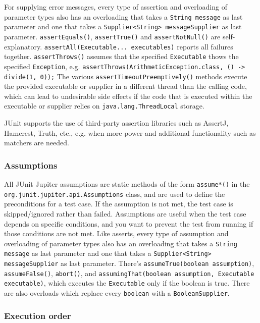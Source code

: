 \documentclass[8pt, table, xcdraw]{article}%
\begin{document}
For supplying error messages, every type of assertion and overloading of parameter types also has an overloading that takes a \lstinline{String message} as last parameter and one that takes a \lstinline{Supplier<String> messageSupplier} as last parameter. \lstinline{assertEquals()}, \lstinline{assertTrue()} and \lstinline{assertNotNull()} are self-explanatory. \lstinline{assertAll(Executable... executables)} reports all failures together. \lstinline{assertThrows()} assumes that the specified \lstinline{Executable} thows the specified \lstinline{Exception}, e.g. \lstinline{assertThrows(ArithmeticException.class, () -> divide(1, 0));} The various \lstinline{assertTimeoutPreemptively()} methods execute the provided executable or supplier in a different thread than the calling code, which can lead to undesirable side effects if the code that is executed within the executable or supplier relies on \lstinline{java.lang.ThreadLocal} storage.

JUnit supports the use of third-party assertion libraries such as AssertJ, Hamcrest, Truth, etc., e.g. when more power and additional functionality such as matchers are needed.

\subsubsection{Assumptions}

All JUnit Jupiter assumptions are static methods of the form \lstinline{assume*()} in the \lstinline{org.junit.jupiter.api.Assumptions} class, and are used to define the preconditions for a test case. If the assumption is not met, the test case is skipped/ignored rather than failed. Assumptions are useful when the test case depends on specific conditions, and you want to prevent the test from running if those conditions are not met. Like asserts, every type of assumption and overloading of parameter types also has an overloading that takes a \lstinline{String message} as last parameter and one that takes a \lstinline{Supplier<String> messageSupplier} as last parameter. There's \lstinline{assumeTrue(boolean assumption)}, \lstinline{assumeFalse()}, \lstinline{abort()}, and \lstinline{assumingThat(boolean assumption, Executable executable)}, which executes the \lstinline{Executable} only if the boolean is true. There are also overloads which replace every \lstinline{boolean} with a \lstinline{BooleanSupplier}.

\subsubsection{Execution order}
\end{document}
